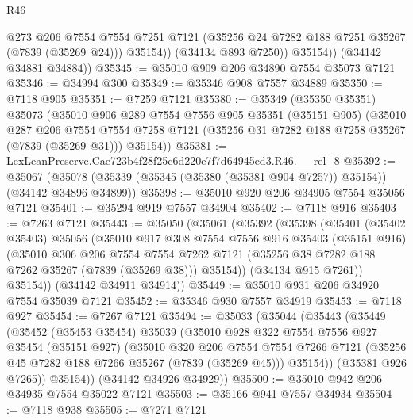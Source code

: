 \begin{lexlean}{R46}
\begin{coremodule}
                @273
                @206
                @7554
                @7554
                @7251
                @7121
                (@35256 @24 @7282 @188 @7251 @35267 (@7839 (@35269 @24)))
                @35154))
            (@34134 @893 @7250))
          @35154))
      (@34142 @34881 @34884))
@35345 := @35010 @909 @206 @34890 @7554 @35073 @7121
@35346 := @34994 @300
@35349 := @35346 @908 @7557 @34889
@35350 := @7118 @905
@35351 := @7259 @7121
@35380 := @35349
    (@35350 @35351)
    @35073
    (@35010
      @906
      @289
      @7554
      @7556
      @905
      @35351
      (@35151 @905)
      (@35010
        @287
        @206
        @7554
        @7554
        @7258
        @7121
        (@35256 @31 @7282 @188 @7258 @35267 (@7839 (@35269 @31)))
        @35154))
@35381 := LexLeanPreserve.Cae723b4f28f25c6d220e7f7d64945ed3.R46.__rel_8
@35392 := @35067
    (@35078 (@35339 (@35345 (@35380 (@35381 @904 @7257)) @35154)) (@34142 @34896 @34899))
@35398 := @35010 @920 @206 @34905 @7554 @35056 @7121
@35401 := @35294 @919 @7557 @34904
@35402 := @7118 @916
@35403 := @7263 @7121
@35443 := @35050
    (@35061
      (@35392
        (@35398
          (@35401
            (@35402 @35403)
            @35056
            (@35010
              @917
              @308
              @7554
              @7556
              @916
              @35403
              (@35151 @916)
              (@35010
                @306
                @206
                @7554
                @7554
                @7262
                @7121
                (@35256 @38 @7282 @188 @7262 @35267 (@7839 (@35269 @38)))
                @35154))
            (@34134 @915 @7261))
          @35154))
      (@34142 @34911 @34914))
@35449 := @35010 @931 @206 @34920 @7554 @35039 @7121
@35452 := @35346 @930 @7557 @34919
@35453 := @7118 @927
@35454 := @7267 @7121
@35494 := @35033
    (@35044
      (@35443
        (@35449
          (@35452
            (@35453 @35454)
            @35039
            (@35010
              @928
              @322
              @7554
              @7556
              @927
              @35454
              (@35151 @927)
              (@35010
                @320
                @206
                @7554
                @7554
                @7266
                @7121
                (@35256 @45 @7282 @188 @7266 @35267 (@7839 (@35269 @45)))
                @35154))
            (@35381 @926 @7265))
          @35154))
      (@34142 @34926 @34929))
@35500 := @35010 @942 @206 @34935 @7554 @35022 @7121
@35503 := @35166 @941 @7557 @34934
@35504 := @7118 @938
@35505 := @7271 @7121

\end{coremodule}
\end{lexlean}
